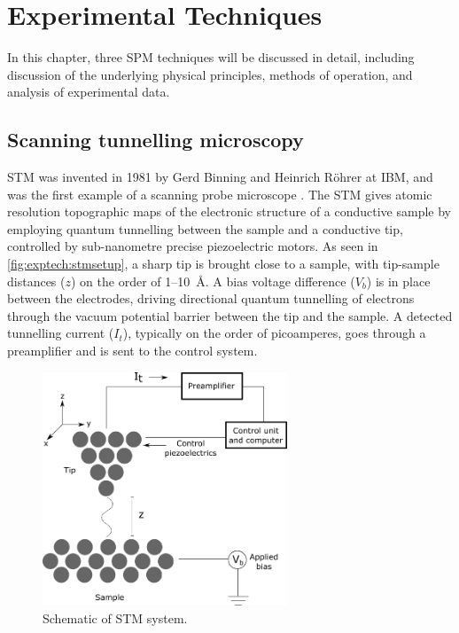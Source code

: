 
\chapter{Experimental Techniques}
\label{ch:exptech}

In this chapter, three \acf{SPM} techniques will be discussed in detail, including discussion of the underlying physical principles, methods of operation, and analysis of experimental data.



\section{Scanning tunnelling microscopy}

\Acf{STM} was invented in 1981 by Gerd Binning and Heinrich R\"ohrer at IBM, and was the first example of a scanning probe microscope \citep{binnig1982surface}. The \ac{STM} gives atomic resolution topographic maps of the electronic structure of a conductive sample by employing quantum tunnelling between the sample and a conductive tip, controlled by sub-nanometre precise piezoelectric motors. As seen in \autoref{fig:exptech:stmsetup}, a sharp tip is brought close to a sample, with tip-sample distances ($z$) on the order of 1--\SI{10}{\angstrom}. A bias voltage difference ($V_b$) is in place between the electrodes, driving  directional quantum tunnelling of electrons through the vacuum potential barrier between the tip and the sample. A detected tunnelling current ($I_t$), typically on the order of picoamperes, goes through a preamplifier and is sent to the control system.

\begin{figure} [h]
    \centering
    \includegraphics[width=0.65\textwidth]{pictures/stm_diagram.png}
    \caption{Schematic of STM system.}
    \label{fig:exptech:stmsetup}
\end{figure}

